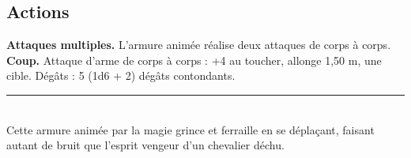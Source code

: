 \begin{figure*}[hb!]
{\begin{minipage}[c]{.45\linewidth}
    \subsection*{Actions}
    {\bfseries Attaques multiples.} L'armure animée réalise deux attaques de corps à corps.\\
    {\bfseries Coup.} Attaque d'arme de corps à corps : +4 au toucher, allonge 1,50 m, une cible. Dégâts : 5 (1d6 + 2) dégâts contondants.\\
    \noindent\rule{\textwidth}{1pt} \\
    Cette armure animée par la magie grince et ferraille en se déplaçant, faisant autant de bruit que l'esprit vengeur d'un chevalier déchu.
  \end{minipage}
}%
\end{figure*}

